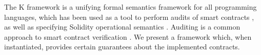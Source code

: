 The K framework \cite{kframework} is a unifying formal semantics framework for
all programming languages, which has been used as a tool to perform
audits of smart contracts \cite{runtimev}, as well as specifying Solidity
operational semantics \cite{solor}. Auditing is a common approach
to smart contract verification \cite{quviq} \cite{tweag}. We present a framework
which, when instantiated, provides certain guarantees about the implemented
contracts.






